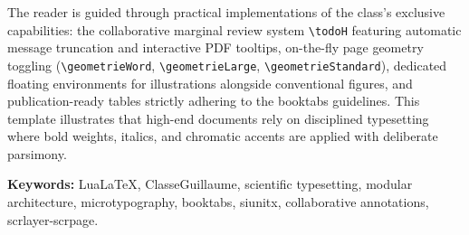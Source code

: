 The reader is guided through practical implementations of the class's exclusive capabilities:
the collaborative marginal review system \texttt{\textbackslash todoH} featuring automatic message truncation and interactive PDF tooltips, on-the-fly page geometry toggling (\texttt{\textbackslash geometrieWord}, \texttt{\textbackslash geometrieLarge}, \texttt{\textbackslash geometrieStandard}), dedicated floating environments for illustrations alongside conventional figures, and publication-ready tables strictly adhering to the \textsf{booktabs} guidelines.
This template illustrates that high-end documents rely on disciplined typesetting where bold weights, italics, and chromatic accents are applied with deliberate parsimony.

\bigskip
\noindent\textbf{Keywords:} Lua\LaTeX{}, ClasseGuillaume, scientific typesetting, modular architecture, microtypography, booktabs, siunitx, collaborative annotations, scrlayer-scrpage.


